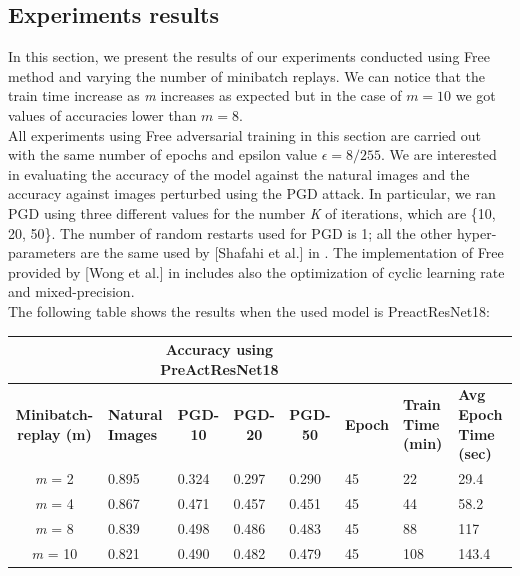 \documentclass{article}
\begin{document}
\subsection{Experiments results}
In this section, we present the results of our experiments conducted using Free
method and varying the number of minibatch replays. We can notice that the train
time increase as \textit{m} increases as expected but in the case of $m=10$ we
got values of accuracies lower than $m=8$.\\
All experiments using Free adversarial training in this section are carried out
with the same number of epochs and epsilon value $\epsilon = 8/255$. We are
interested in evaluating the accuracy of the model against the natural images and
the accuracy against images perturbed using the PGD attack. In particular, we
ran PGD using three different values for the number \textit{K} of iterations,
which are \{10, 20, 50\}. The number of random restarts used for PGD is 1; all the
other hyper-parameters are the same used by [Shafahi et al.] in
\cite{ShafahiEtAl2019b}. The implementation of Free provided by [Wong et al.] in
\cite{WongEtAl2020} includes also the optimization of cyclic learning rate and
mixed-precision.\\
The following table shows the results when the used model is PreactResNet18:
\begin{table}[hbt!]
\begin{tabular}{|c|l|l|l|l|l|l|p{2cm}|}
\hline
\multicolumn{1}{|l|}{{ }}        & \multicolumn{4}{c|}{{ \textbf{Accuracy using
PreActResNet18}}}
& \multicolumn{3}{l|}{{ }}
\\ \hline
{ \textbf{Minibatch-replay (m)}} & \multicolumn{1}{p{1.5cm}|}{{ \textbf{Natural
Images}}} & \multicolumn{1}{c|}{{ \textbf{PGD-10}}} & \multicolumn{1}{c|}{{
\textbf{PGD-20}}} & \multicolumn{1}{c|}{{ \textbf{PGD-50}}} &
\multicolumn{1}{c|}{{ \textbf{Epoch}}} & \multicolumn{1}{p{1.5cm}|}{{
\textbf{Train Time (min)}}} & \multicolumn{1}{p{1.5cm}|}{{ \textbf{Avg Epoch
Time (sec)}}} \\ \hline
{ \textit{m} = 2}                & { 0.895}
& { 0.324}                                & { 0.297}
& { 0.290}                                & { 45}
& { 22 }                               & { 29.4 }
\\ \hline
{ \textit{m} = 4}                & { 0.867}
& { 0.471}                                & { 0.457}
& { 0.451}                                & { 45}
& { 44 }                               & { 58.2 }
\\ \hline
{ \textit{m} = 8}                & { 0.839}
& { 0.498}                                & { 0.486}
& { 0.483}                                & { 45}
& { 88 }                               & { 117 }
\\ \hline
{ \textit{m} = 10}               & { 0.821}
& { 0.490}                                & { 0.482}
& { 0.479}                                & { 45}
& { 108 }                              & { 143.4 }
\\ \hline
\end{tabular}
\end{table}
\end{document}
